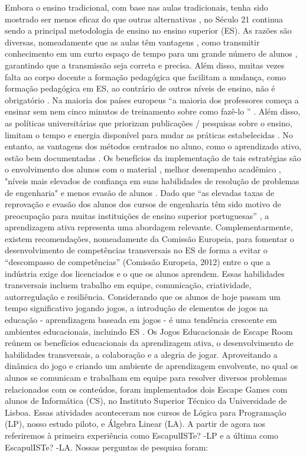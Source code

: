 Embora o ensino tradicional, com base nas aulas tradicionais, tenha sido mostrado ser menos eficaz do que outras alternativas \citep{freeman_active_2014}, no Século 21 continua sendo a principal metodologia de ensino no ensino superior (ES)\citep{wanner_enhancing_2015, yeung_online_2016}. As razões são diversas, nomeadamente que as aulas têm vantagens \citep{webster_defence_nodate}, como transmitir conhecimento em um curto espaço de tempo para um grande número de alunos \citep{gregory_lecture_2013}, garantindo que a transmissão seja correta e precisa. Além disso, muitas vezes falta ao corpo docente a formação pedagógica que facilitam a mudança, como formação pedagógica em ES, ao contrário de outros níveis de ensino, não é obrigatório \citep{jensen_higher_2011}. Na maioria dos países europeus “a maioria dos professores começa a ensinar sem nem cinco minutos de treinamento sobre como fazê-lo ” \citep{rugarcia_future_2000}. Além disso, as políticas universitárias que priorizam publicações / pesquisas sobre o ensino, limitam o tempo e energia disponível para mudar as práticas estabelecidas \citep{waldrop_science_2015}. No entanto, as vantagens dos métodos centrados no aluno, como o aprendizado ativo, estão bem documentadas \citep{prince_does_2004}. Os benefícios da implementação de tais estratégias são o envolvimento dos alunos com o material \citep{ghilay_tbal_2015}, melhor desempenho acadêmico \citep{freeman_active_2014}, "níveis mais elevados de confiança em suas habilidades de resolução de problemas de engenharia" \citep{felder_longitudinal_1997} e menos evasão de alunos \citep{pundak_attitudes_2010}. Dado que “as elevadas taxas de reprovação e evasão dos alunos dos cursos de engenharia têm sido motivo de preocupação para muitas instituições de ensino superior portuguesas” \citep{williams_using_2010}, a aprendizagem ativa representa uma abordagem relevante. Complementarmente, existem recomendações, nomeadamente da Comissão Europeia, para fomentar o desenvolvimento de competências transversais no ES de forma a evitar o “descompasso de competências” (Comissão Europeia, 2012) entre o que a indústria exige dos licenciados e o que os alunos aprendem. Essas habilidades transversais incluem trabalho em equipe, comunicação, criatividade, autorregulação e resiliência. Considerando que os alunos de hoje passam um tempo significativo jogando jogos, a introdução de elementos de jogos na educação - aprendizagem baseada em jogos - é uma tendência crescente em ambientes educacionais, incluindo ES \citep{clarke_escaped_2017}. Os Jogos Educacionais de Escape Room reúnem os benefícios educacionais da aprendizagem ativa, o desenvolvimento de habilidades transversais, a colaboração e a alegria de jogar. Aproveitando a dinâmica do jogo e criando um ambiente de aprendizagem envolvente, no qual os alunos se comunicam e trabalham em equipe para resolver diversos problemas relacionados com os conteúdos, foram implementados dois Escape Games com alunos de Informática (CS), no Instituto Superior Técnico da Universidade de Lisboa. Essas atividades aconteceram nos cursos de Lógica para Programação (LP), nosso estudo piloto, e Álgebra Linear (LA). A partir de agora nos referiremos à primeira experiência como EscapulISTe? -LP e a última como EscapulISTe? -LA. Nossas perguntas de pesquisa foram:

